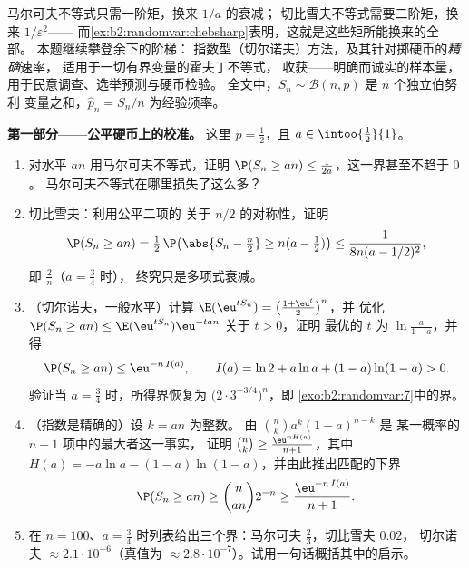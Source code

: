 \begin{problem}
\label{pb:b2:randomvar:1}
马尔可夫不等式只需一阶矩，换来 $1/a$ 的衰减；
切比雪夫不等式需要二阶矩，换来 $1/\varepsilon^2$——
而\cref{ex:b2:randomvar:chebsharp}表明，这就是这些矩所能换来的全部。
本题继续攀登余下的阶梯：
指数型（切尔诺夫）方法，及其针对掷硬币的\emph{精确}速率，
适用于一切有界变量的霍夫丁不等式，
收获——明确而诚实的样本量，
用于民意调查、选举预测与硬币检验。
全文中，$S_n \sim
\mathcal B(n, p)$ 是 $n$ 个独立伯努利
变量之和，$\widehat p_n = S_n/n$ 为经验频率。

\medskip
\noindent\textbf{第一部分——公平硬币上的校准。}
这里 $p = \frac12$，且 $a \in \intoo{\frac12}{1}$。
\begin{enumerate}
  \item 对水平 $an$ 用马尔可夫不等式，证明 $\P(S_n \geq an) \leq
        \frac1{2a}$，这一界甚至不趋于 $0$。
        马尔可夫不等式在哪里损失了这么多？
  \item 切比雪夫：利用公平二项的
        关于 $n/2$ 的对称性，证明
        \[
        \P(S_n \geq an) = \tfrac12\,
        \P\bigl(\abs{S_n - \tfrac n2} \geq n(a -
        \tfrac12)\bigr)
        \leq \frac{1}{8n(a - 1/2)^2},
        \]
        即 $\frac2n$（$a = \frac34$ 时），
        终究只是多项式衰减。
  \item （切尔诺夫，一般水平）计算
        $\E(\eu^{tS_n}) = \bigl(\frac{1 + \eu^t}2\bigr)^n$，并
        优化 $\P(S_n \geq an) \leq
        \E(\eu^{tS_n})\eu^{-tan}$ 关于 $t > 0$，证明
        最优的 $t$ 为 $\ln\frac{a}{1-a}$，并得
        \[
        \P(S_n \geq an) \leq \eu^{-n\,I(a)},
        \qquad
        I(a) = \ln 2 + a\ln a + (1-a)\ln(1-a) > 0 .
        \]
        验证当 $a = \frac34$ 时，所得界恢复为
        $\bigl(2\cdot3^{-3/4}\bigr)^n$，即
        \cref{exo:b2:randomvar:7}中的界。
  \item （指数是精确的）设 $k = an$ 为整数。
        由 $\binom nk a^k(1-a)^{n-k}$ 是
        某一概率的 $n + 1$ 项中的最大者这一事实，
        证明 $\binom nk \geq
        \frac{\eu^{nH(a)}}{n+1}$，其中 $H(a) = -a\ln a -
        (1-a)\ln(1-a)$，并由此推出匹配的下界
        \[
        \P(S_n \geq an) \geq \binom{n}{an}2^{-n}
        \geq \frac{\eu^{-n\,I(a)}}{n + 1} .
        \]
  \item 在 $n = 100$、$a =
        \frac34$ 时列表给出三个界：马尔可夫 $\frac23$，切比雪夫 $0.02$，
        切尔诺夫 $\approx 2.1\cdot10^{-6}$（真值为
        $\approx 2.8\cdot10^{-7}$）。试用一句话概括其中的启示。
\end{enumerate}


\end{problem}
